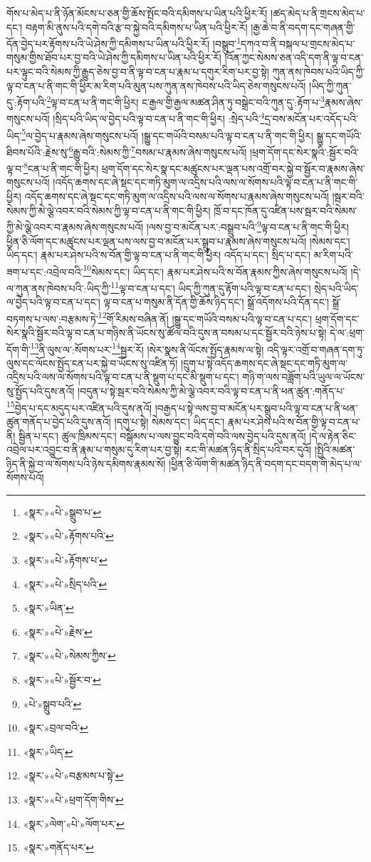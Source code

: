 གོས་པ་མེད་པ་ནི་ཉོན་མོངས་པ་ཅན་གྱི་ཆོས་སྤོང་བའི་དམིགས་པ་ཡིན་པའི་ཕྱིར་རོ། །ཚད་མེད་པ་ནི་གྲངས་མེད་པ་དང་། བརྟག་མི་ནུས་པའི་དགེ་བའི་རྩ་བ་སྐྱེ་བའི་དམིགས་པ་ཡིན་པའི་ཕྱིར་རོ། །རྒྱ་ཆེ་བ་ནི་བདག་དང་གཞན་གྱི་དོན་བྱེད་པར་རྟོགས་པའི་ཡེ་ཤེས་ཀྱི་དམིགས་པ་ཡིན་པའི་ཕྱིར་རོ། །བསྒྲུབ་\footnote{«སྣར་»«པེ་»སྒྲུབ་པ་}དཀའ་བ་ནི་བསྐལ་པ་གྲངས་མེད་པ་གསུམ་གྱིས་ཐོབ་པར་བྱ་བའི་ཡེ་ཤེས་ཀྱི་དམིགས་པ་ཡིན་པའི་ཕྱིར་རོ། །འོན་ཀྱང་སེམས་ཅན་འདི་དག་ནི་ལྟ་བ་ངན་པར་ལྟུང་བའི་སེམས་ཀྱི་རྒྱུད་ཅེས་བྱ་བ་ནི་ལྟ་བ་ངན་པ་རྣམ་པ་དགུར་རིག་པར་བྱ་སྟེ། ཀུན་ནས་ཁེབས་པའི་ཡིད་ཀྱི་ལྟ་བ་ངན་པ་ནི་གང་གི་ཕྱིར་མ་རིག་པའི་མུན་པས་ཀུན་ནས་ཁེབས་པའི་ཡིད་ཅེས་གསུངས་པའོ། །ཡིད་ཀྱི་ཀུན་དུ་:རྟོག་པའི་\footnote{«སྣར་»«པེ་»རྟོགས་པའི་}ལྟ་བ་ངན་པ་ནི་གང་གི་ཕྱིར། ང་རྒྱལ་གྱི་རྒྱལ་མཚན་ཤིན་ཏུ་བསྒྲེང་བའི་ཀུན་དུ་:རྟོག་པ་\footnote{«སྣར་»«པེ་»རྟོགས་པ་}རྣམས་ཞེས་གསུངས་པའོ། །སྲིད་པའི་ཡིད་ལ་བྱེད་པའི་ལྟ་བ་ངན་པ་ནི་གང་གི་ཕྱིར། :སྲེད་པའི་\footnote{«སྣར་»«པེ་»སྲིད་པའི་}དྲ་བས་མངོན་པར་འདོད་པའི་ཡིད་\footnote{«སྣར་»ཡིན་}ལ་བྱེད་པ་རྣམས་ཞེས་གསུངས་པའོ། །སྒྱུ་དང་གཡོའི་བསམ་པའི་ལྟ་བ་ངན་པ་ནི་གང་གི་ཕྱིར། སྒྱུ་དང་གཡོའི་ཐིབས་པོའི་:རྗེས་སུ་\footnote{«སྣར་»«པེ་»རྗེས་}རྒྱུ་བའི་:སེམས་ཀྱི་\footnote{«སྣར་»«པེ་»སེམས་ཀྱིས་}བསམ་པ་རྣམས་ཞེས་གསུངས་པའོ། །ཕྲག་དོག་དང་སེར་སྣའི་:སྦྱོར་བའི་ལྟ་བ་\footnote{«སྣར་»«པེ་»སྦྱོར་བ་}ངན་པ་ནི་གང་གི་ཕྱིར། ཕྲག་དོག་དང་སེར་སྣ་དང་མཚུངས་པར་ལྡན་པས་འགྲོ་བར་སྐྱེ་བ་སྦྱོར་བ་རྣམས་ཞེས་གསུངས་པའོ། །འདོད་ཆགས་དང་ཞེ་སྡང་དང་གཏི་མུག་ལ་འདྲིས་པའི་ལས་ལ་སོགས་པའི་ལྟ་བ་ངན་པ་ནི་གང་གི་ཕྱིར། འདོད་ཆགས་དང་ཞེ་སྡང་དང་གཏི་མུག་ལ་འདྲིས་པའི་ལས་ལ་སོགས་པ་རྣམས་ཞེས་གསུངས་པའོ། །སྦར་བའི་སེམས་ཀྱི་མེ་ལྕེ་འབར་བའི་སེམས་ཀྱི་ལྟ་བ་ངན་པ་ནི་གང་གི་ཕྱིར། ཁྲོ་བ་དང་ཁོན་དུ་འཛིན་པས་སྦར་བའི་སེམས་ཀྱི་མེ་ལྕེ་འབར་བ་རྣམས་ཞེས་གསུངས་པའོ། །ལས་བྱ་བ་མངོན་པར་:བསྒྲུབ་པའི་\footnote{«པེ་»སྒྲུབ་པའི་}ལྟ་བ་ངན་པ་ནི་གང་གི་ཕྱིར། ཕྱིན་ཅི་ལོག་དང་མཚུངས་པར་ལྡན་པས་ལས་བྱ་བ་མངོན་པར་སྒྲུབ་པ་རྣམས་ཞེས་གསུངས་པའོ། །སེམས་དང་། ཡིད་དང་། རྣམ་པར་ཤེས་པའི་ས་བོན་གྱི་ལྟ་བ་ངན་པ་ནི་གང་གི་ཕྱིར། འདོད་པ་དང་། སྲིད་པ་དང་། མ་རིག་པའི་ཟག་པ་དང་:འབྲེལ་བའི་\footnote{«སྣར་»བྲལ་བའི་}སེམས་དང་། ཡིད་དང་། རྣམ་པར་ཤེས་པའི་ས་བོན་རྣམས་ཀྱིས་ཞེས་གསུངས་པའོ། །དེ་ལ་ཀུན་ནས་ཁེབས་པའི་:ཡིད་ཀྱི་\footnote{«སྣར་»ཡིད་}ལྟ་བ་ངན་པ་དང་། ཡིད་ཀྱི་ཀུན་དུ་རྟོག་པའི་ལྟ་བ་ངན་པ་དང་། སྲེད་པའི་ཡིད་ལ་བྱེད་པའི་ལྟ་བ་ངན་པ་དང་། ལྟ་བ་ངན་པ་གསུམ་ནི་དོན་གྱི་ཆོས་ཉིད་དང་། སྒྲོ་འདོགས་པའི་དོན་དང་། སྒྲོ་བཏགས་པ་ལས་:བརྩམས་ཏེ་\footnote{«སྣར་»«པེ་»བརྩམས་པ་སྟེ་}གོ་རིམས་བཞིན་ནོ། །སྒྱུ་དང་གཡོའི་བསམ་པའི་ལྟ་བ་ངན་པ་དང་། ཕྲག་དོག་དང་སེར་སྣའི་སྦྱོར་བའི་ལྟ་བ་ངན་པ་གཉིས་ནི་ཡོངས་སུ་ཚོལ་བའི་དུས་ན་བསམ་པ་དང་སྦྱོར་བའི་ཉེས་པ་སྟེ། དེ་ལ་:ཕྲག་དོག་གི་\footnote{«སྣར་»«པེ་»ཕྲག་དོག་གིས་}ནི་ལུས་ལ་:སོགས་པར་\footnote{«སྣར་»ལེག་«པེ་»ལོག་པར་}སྦྱར་རོ། །སེར་སྣས་ནི་ལོངས་སྤྱོད་རྣམས་ལ་སྟེ། འདི་ལྟར་འགྲོ་བ་གཞན་དག་ཏུ་ལུས་དང་ལོངས་སྤྱོད་ངན་པར་སྐྱེ་བ་ཡོངས་སུ་འཛིན་ཏོ། །དྲུག་པ་སྟེ་འདོད་ཆགས་དང་ཞེ་སྡང་དང་གཏི་མུག་ལ་འདྲིས་པའི་ལས་ལ་སོགས་པའི་ལྟ་བ་ངན་པ་ནི་སྡུག་པ་དང་མི་སྡུག་པ་དང་། གཉི་ག་ལས་བཟློག་པའི་ཡུལ་ལ་ཡོངས་སུ་སྤྱོད་པའི་དུས་ནའོ། །བདུན་པ་སྟེ་སྦར་བའི་སེམས་ཀྱི་མེ་ལྕེ་འབར་བའི་ལྟ་བ་ངན་པ་ནི་ཕན་ཚུན་:གནོད་པ་\footnote{«སྣར་»གནོད་པར་}བྱེད་པ་དང་མདུད་པར་འཛིན་པའི་དུས་ནའོ། །བརྒྱད་པ་སྟེ་ལས་བྱ་བ་མངོན་པར་སྒྲུབ་པའི་ལྟ་བ་ངན་པ་ནི་ཕན་ཚུན་གནོད་པ་བྱེད་པའི་དུས་ནའོ། །དགུ་པ་སྟེ། སེམས་དང་། ཡིད་དང་། རྣམ་པར་ཤེས་པའི་ས་བོན་གྱི་ལྟ་བ་ངན་པ་ནི། སྦྱིན་པ་དང་། ཚུལ་ཁྲིམས་དང་། བསྒོམས་པ་ལས་བྱུང་བའི་དགེ་བའི་ལས་བྱེད་པའི་དུས་ནའོ། །དེ་ལ་རྟེན་ཅིང་འབྲེལ་པར་འབྱུང་བ་ནི་རྣམ་པ་གསུམ་དུ་རིག་པར་བྱ་སྟེ། རང་གི་མཚན་ཉིད་ནི་སྲིད་པའི་བར་དུའོ། །སྤྱིའི་མཚན་ཉིད་ནི་སྐྱེ་བ་ལ་སོགས་པའི་ཉེས་དམིགས་རྣམས་སོ། །ཕྱིན་ཅི་ལོག་གི་མཚན་ཉིད་ནི་བདག་དང་བདག་གི་མེད་པ་ལ་སོགས་པའོ། 